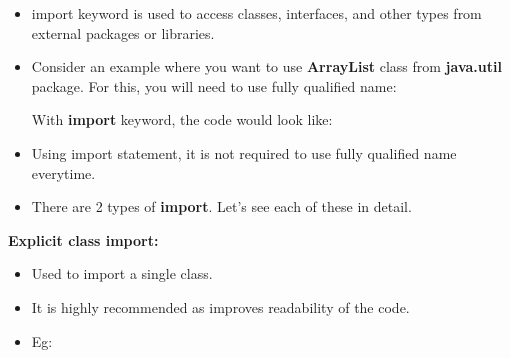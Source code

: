\setlength{\columnsep}{3pt}
\begin{flushleft}
	
	\begin{itemize}
		\item import keyword is used to access classes, interfaces, and other types from external packages or libraries. 

		\item Consider an example where you want to use \textbf{ArrayList} class from \textbf{java.util} package. For this, you will need to use fully qualified name:
		\bigskip
	
		With \textbf{import} keyword, the code would look like:
		\bigskip
		
		\item Using import statement, it is not required to use fully qualified name everytime.
		\bigskip
		\item 		There are 2 types of \textbf{import}. Let's see each of these in detail.	
		\end{itemize}		

		\newpage

		\textbf{Explicit class import:} 
		\begin{itemize}
			\item Used to import a single class.
			\item It is highly recommended as improves readability of the code.
			\bigskip
			\item Eg:
		\end{itemize}
		

\end{flushleft}
